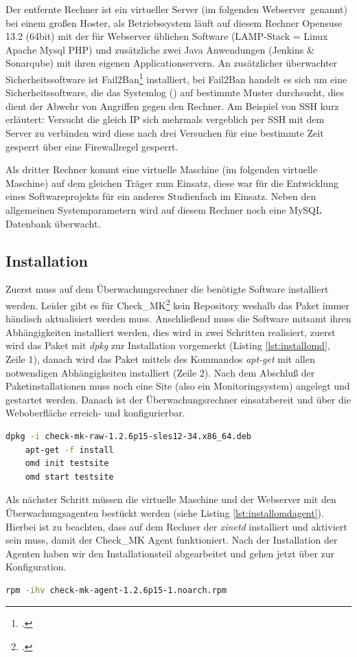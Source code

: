 \documentclass[12pt,a4paper,parskip,listof=totoc,bibliography=totoc]{scrreprt}
\begin{document}
	Der entfernte Rechner ist ein virtueller Server (im folgenden \glqq Webserver\grqq\ genannt) bei einem großen Hoster, als Betriebssystem läuft auf diesem Rechner Opensuse 13.2 (64bit) mit der für Webserver üblichen Software (LAMP-Stack = Linux Apache Mysql PHP) und zusätzliche zwei Java Anwendungen (Jenkins \& Sonarqube) mit ihren eigenen Applicationservern. An zusätzlicher überwachter Sicherheitssoftware ist Fail2Ban\footcite{fail2ban} installiert, bei Fail2Ban handelt es sich um eine Sicherheitssoftware, die das Systemlog () auf bestimmte Muster durchsucht, dies dient der Abwehr von Angriffen gegen den Rechner. Am Beispiel von SSH kurz erläutert: Versucht die gleich IP sich mehrmals vergeblich per SSH mit dem Server zu verbinden wird diese nach drei Versuchen für eine bestimmte Zeit gesperrt über eine Firewallregel gesperrt.
	
	Als dritter Rechner kommt eine virtuelle Maschine (im folgenden \glqq virtuelle Maschine\grqq) auf dem gleichen Träger zum Einsatz, diese war für die Entwicklung eines Softwareprojekts für ein anderes Studienfach im Einsatz. Neben den allgemeinen Systemparametern wird auf diesem Rechner noch eine MySQL Datenbank überwacht.
	\subsection{Installation}
	Zuerst muss auf dem Überwachungsrechner die benötigte Software installiert werden. Leider gibt es für Check\_MK\footcite{checkmk} kein Repository weshalb das Paket immer händisch aktualisiert werden muss.
    Anschließend muss die Software mitsamt ihren Abhängigkeiten installiert werden, dies wird in zwei Schritten realisiert, zuerst wird das Paket mit \textit{dpkg} zur Installation vorgemerkt (Listing \ref{lst:installomd}, Zeile 1), danach wird das Paket mittels des Kommandos \textit{apt-get} mit allen notwendigen Abhängigkeiten installiert (Zeile 2). Nach dem Abschluß der Paketinstallationen muss noch eine Site (also ein Monitoringsystem) angelegt und gestartet werden. Danach ist der Überwachungsrechner einsatzbereit und über die Weboberfläche erreich- und konfigurierbar. \medskip
	\begin{lstlisting}[language=bash, caption=Installation von Check\_MK, label=lst:installomd]	
	dpkg -i check-mk-raw-1.2.6p15-sles12-34.x86_64.deb
	apt-get -f install
	omd init testsite 
	omd start testsite\end{lstlisting}
	Als nächster Schritt müssen die virtuelle Maschine und der Webserver mit den Überwachungsagenten bestückt werden (siehe Listing \ref{lst:installomdagent}). Hierbei ist zu beachten, dass auf dem Rechner der \textit{xinetd} installiert und aktiviert sein muss, damit der Check\_MK Agent funktioniert. Nach der Installation der Agenten haben wir den Installationsteil abgearbeitet und gehen jetzt über zur Konfiguration.
	\begin{lstlisting}[language=bash, caption=Installation des Check\_MK Agenten, label=lst:installomdagent]
	rpm -ihv check-mk-agent-1.2.6p15-1.noarch.rpm\end{lstlisting}
\end{document}
